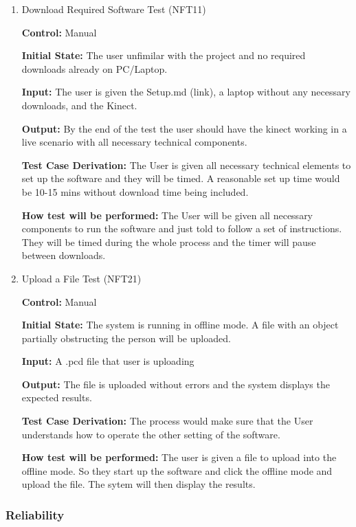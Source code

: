 \documentclass[12pt, titlepage]{article}
\begin{document}
\begin{enumerate}

\item{Download Required Software Test (NFT11)\label{NFT11}\\}
  
\textbf{Control:} Manual

\textbf{Initial State:} The user unfimilar with the project and no required downloads already on PC/Laptop.

\textbf{Input:} The user is given the Setup.md (link), a laptop without any necessary downloads, and the Kinect.

\textbf{Output:} By the end of the test the user should have the kinect working in a live scenario with all necessary technical components.

\textbf{Test Case Derivation:} The User is given all necessary technical elements to set up the software and they will be timed. A reasonable set up time would be 10-15 mins without download time being included.

\textbf{How test will be performed:} The User will be given all necessary components to run the software and just told to follow a set of instructions. They will be timed during the whole process and the timer will pause between downloads.

\item{Upload a File Test (NFT21)\label{NFT12}\\}
  
\textbf{Control:} Manual

\textbf{Initial State:} The system is running in offline mode. A file with an object partially obstructing the person will be uploaded.

\textbf{Input:} A .pcd file that user is uploading

\textbf{Output:} The file is uploaded without errors and the system displays the expected results.

\textbf{Test Case Derivation:} The process would make sure that the User understands how to operate the other setting of the software.

\textbf{How test will be performed:} The user is given a file to upload into the offline mode. So they start up the software and click the offline mode and upload the file. The sytem will then display the results. 
\end{enumerate}

\subsubsection{Reliability}
\end{document}
